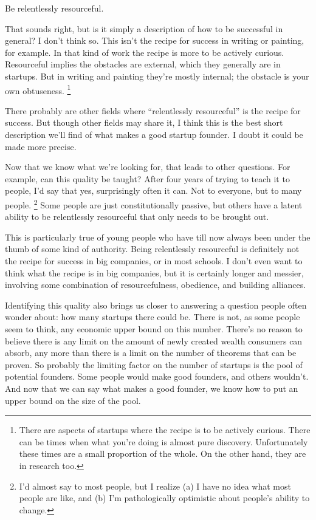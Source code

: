 \documentclass[12pt]{book}
\begin{document}
Be relentlessly resourceful.

That sounds right, but is it simply a description of how to be
successful in general? I don't think so. This isn't the recipe for
success in writing or painting, for example. In that kind of work the
recipe is more to be actively curious. Resourceful implies the obstacles
are external, which they generally are in startups. But in writing and
painting they're mostly internal; the obstacle is your own obtuseness.
\footnote{There are aspects of startups where the recipe is to be actively
curious. There can be times when what you're doing is almost pure
discovery. Unfortunately these times are a small proportion of the
whole. On the other hand, they are in research too.}

There probably are other fields where ``relentlessly resourceful'' is
the recipe for success. But though other fields may share it, I think
this is the best short description we'll find of what makes a good
startup founder. I doubt it could be made more precise.

Now that we know what we're looking for, that leads to other questions.
For example, can this quality be taught? After four years of trying to
teach it to people, I'd say that yes, surprisingly often it can. Not to
everyone, but to many people. \footnote{I'd almost say to most people, but I realize (a) I have no idea
what most people are like, and (b) I'm pathologically optimistic about
people's ability to change.} Some people are
just constitutionally passive, but others have a latent ability to be
relentlessly resourceful that only needs to be brought out.

This is particularly true of young people who have till now always been
under the thumb of some kind of authority. Being relentlessly
resourceful is definitely not the recipe for success in big companies,
or in most schools. I don't even want to think what the recipe is in big
companies, but it is certainly longer and messier, involving some
combination of resourcefulness, obedience, and building alliances.

Identifying this quality also brings us closer to answering a question
people often wonder about: how many startups there could be. There is
not, as some people seem to think, any economic upper bound on this
number. There's no reason to believe there is any limit on the amount of
newly created wealth consumers can absorb, any more than there is a
limit on the number of theorems that can be proven. So probably the
limiting factor on the number of startups is the pool of potential
founders. Some people would make good founders, and others wouldn't. And
now that we can say what makes a good founder, we know how to put an
upper bound on the size of the pool.
\end{document}
